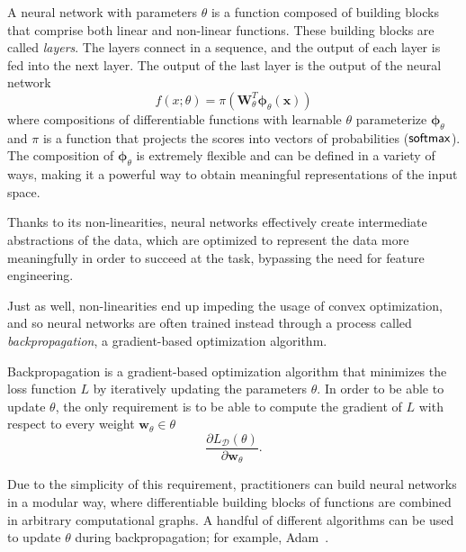 \begin{definition}
    A neural network with parameters $\theta$ is a function
    composed of building blocks that comprise both linear and non-linear
    functions. These building blocks are called \textit{layers}.
    The layers connect in a sequence, and the output of each
    layer is fed into the next layer. The output of the last layer is
    the output of the neural network
    \begin{equation}
        f(x; \theta) = \pi 
        \left(\bm{W}_{\theta}^T\bm{\phi}_{\theta}\left(\bm{x}\right)\right)
    \end{equation}
    where compositions of differentiable functions with learnable
    $\theta$ parameterize $\bm{\phi}_{\theta}$ and $\pi$ is a
    function that projects the scores into vectors of probabilities (\eg $\operatorname*{\mathsf{softmax}}$).
    The composition of $\bm{\phi}_{\theta}$ is extremely flexible and
    can be defined in a variety of ways, making it a powerful way to
    obtain meaningful representations of the input space.
\end{definition}
%
Thanks to its non-linearities, neural networks effectively create
intermediate abstractions of the data, which are optimized to represent the data
more meaningfully in order to succeed at the task, bypassing the need
for feature engineering.

Just as well, non-linearities end up
impeding the usage of convex optimization, and so neural networks are
often trained instead through a process called
\textit{backpropagation}, a gradient-based optimization algorithm.

\newpage %

\begin{definition}[backpropagation]
    Backpropagation is a gradient-based optimization algorithm that
    minimizes the loss function $L$ by iteratively updating the
    parameters $\theta$. In order to be able to update $\theta$,
    the only requirement is to be able to compute the gradient of
    $L$ with respect to every weight $\bm{w}_\theta\in\theta$
    \begin{equation}
        \frac{\partial L_{\mathcal{D}}(\theta)}{\partial \bm{w}_\theta}.
    \end{equation}
\end{definition}

Due to the simplicity of this requirement, practitioners can build
neural networks in a modular way, where differentiable building
blocks of functions are combined in arbitrary computational graphs. A
handful of different algorithms can be used to update $\theta$ during
backpropagation; for example, Adam~\citep{kingma2014adam}.

